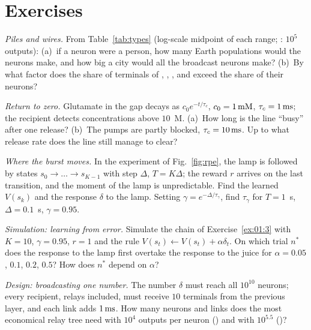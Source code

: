 \section{Exercises}

\begin{exercise}[\lvlA]
\label{ex:01:1}
\emph{Piles and wires.} From Table~\ref{tab:types} (log-scale midpoint of each range; : $10^5$ outputs): (a)~if a neuron were a person, how many Earth populations would the  neurons make, and how big a city would all the broadcast neurons make? (b)~By what factor does the share of terminals of , , , and  exceed the share of their neurons?
\end{exercise}

\begin{exercise}[\lvlA]
\label{ex:01:2}
\emph{Return to zero.} Glutamate in the gap decays as $c_0e^{-t/\tau_c}$, $c_0=1\,\text{mM}$, $\tau_c=1\,\text{ms}$; the recipient detects concentrations above $10$~\textmu M. (a)~How long is the line ``busy'' after one release? (b)~The pumps are partly blocked, $\tau_c=10\,\text{ms}$. Up to what release rate does the line still manage to clear?
\end{exercise}

\begin{exercise}[\lvlB]
\label{ex:01:3}
\emph{Where the burst moves.} In the experiment of Fig.~\ref{fig:rpe}, the lamp is followed by states $s_0\to\dots\to s_{K-1}$ with step $\Delta$, $T=K\Delta$; the reward $r$ arrives on the last transition, and the moment of the lamp is unpredictable. Find the learned $V(s_k)$ and the response $\delta$ to the lamp. Setting $\gamma=e^{-\Delta/\tau_\gamma}$, find $\tau_\gamma$ for $T=1$~s, $\Delta=0.1$~s, $\gamma=0.95$.
\end{exercise}

\begin{exercise}[\lvlB]
\label{ex:01:4}
\emph{Simulation: learning from error.} Simulate the chain of Exercise~\ref{ex:01:3} with $K=10$, $\gamma=0.95$, $r=1$ and the rule $V(s_t)\leftarrow V(s_t)+\alpha\delta_t$. On which trial $n^*$ does the response to the lamp first overtake the response to the juice for $\alpha=0.05$, $0.1$, $0.2$, $0.5$? How does $n^*$ depend on $\alpha$?
\end{exercise}

\begin{exercise}[\lvlB]
\label{ex:01:5}
\emph{Design: broadcasting one number.} The number $\delta$ must reach all $10^{10}$ neurons; every recipient, relays included, must receive $10$ terminals from the previous layer, and each link adds $1\,\text{ms}$. How many neurons and links does the most economical relay tree need with $10^4$ outputs per neuron () and with $10^{5.5}$ ()?
\end{exercise}


